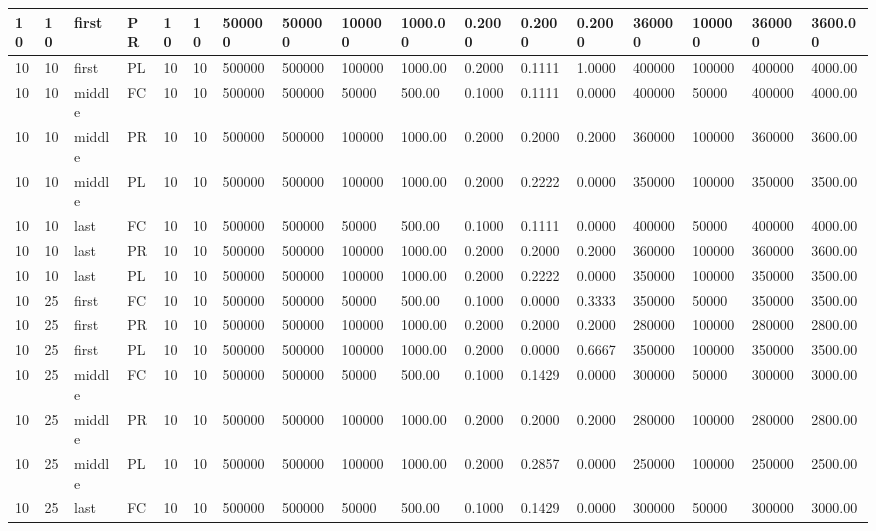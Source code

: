 \begin{tabular}{|l|l|l|l|l|l|l|l|l|l|l|l|l|l|l|l|l|}
10 & 10 & first & PR & 10 & 10 & 500000 & 500000 & 100000 & 1000.00 & 0.2000 & 0.2000 & 0.2000 & 360000 & 100000 & 360000 & 3600.00 \\ \hline
10 & 10 & first & PL & 10 & 10 & 500000 & 500000 & 100000 & 1000.00 & 0.2000 & 0.1111 & 1.0000 & 400000 & 100000 & 400000 & 4000.00 \\ \hline
10 & 10 & middle & FC & 10 & 10 & 500000 & 500000 & 50000 & 500.00 & 0.1000 & 0.1111 & 0.0000 & 400000 & 50000 & 400000 & 4000.00 \\ \hline
10 & 10 & middle & PR & 10 & 10 & 500000 & 500000 & 100000 & 1000.00 & 0.2000 & 0.2000 & 0.2000 & 360000 & 100000 & 360000 & 3600.00 \\ \hline
10 & 10 & middle & PL & 10 & 10 & 500000 & 500000 & 100000 & 1000.00 & 0.2000 & 0.2222 & 0.0000 & 350000 & 100000 & 350000 & 3500.00 \\ \hline
10 & 10 & last & FC & 10 & 10 & 500000 & 500000 & 50000 & 500.00 & 0.1000 & 0.1111 & 0.0000 & 400000 & 50000 & 400000 & 4000.00 \\ \hline
10 & 10 & last & PR & 10 & 10 & 500000 & 500000 & 100000 & 1000.00 & 0.2000 & 0.2000 & 0.2000 & 360000 & 100000 & 360000 & 3600.00 \\ \hline
10 & 10 & last & PL & 10 & 10 & 500000 & 500000 & 100000 & 1000.00 & 0.2000 & 0.2222 & 0.0000 & 350000 & 100000 & 350000 & 3500.00 \\ \hline
10 & 25 & first & FC & 10 & 10 & 500000 & 500000 & 50000 & 500.00 & 0.1000 & 0.0000 & 0.3333 & 350000 & 50000 & 350000 & 3500.00 \\ \hline
10 & 25 & first & PR & 10 & 10 & 500000 & 500000 & 100000 & 1000.00 & 0.2000 & 0.2000 & 0.2000 & 280000 & 100000 & 280000 & 2800.00 \\ \hline
10 & 25 & first & PL & 10 & 10 & 500000 & 500000 & 100000 & 1000.00 & 0.2000 & 0.0000 & 0.6667 & 350000 & 100000 & 350000 & 3500.00 \\ \hline
10 & 25 & middle & FC & 10 & 10 & 500000 & 500000 & 50000 & 500.00 & 0.1000 & 0.1429 & 0.0000 & 300000 & 50000 & 300000 & 3000.00 \\ \hline
10 & 25 & middle & PR & 10 & 10 & 500000 & 500000 & 100000 & 1000.00 & 0.2000 & 0.2000 & 0.2000 & 280000 & 100000 & 280000 & 2800.00 \\ \hline
10 & 25 & middle & PL & 10 & 10 & 500000 & 500000 & 100000 & 1000.00 & 0.2000 & 0.2857 & 0.0000 & 250000 & 100000 & 250000 & 2500.00 \\ \hline
10 & 25 & last & FC & 10 & 10 & 500000 & 500000 & 50000 & 500.00 & 0.1000 & 0.1429 & 0.0000 & 300000 & 50000 & 300000 & 3000.00 \\ \hline

\end{tabular}
